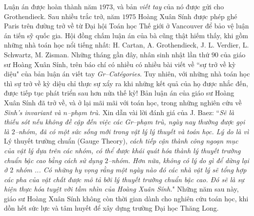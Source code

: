 \begin{multicols}{2}
	\vskip 0.1cm
	Luận án được hoàn thành năm $1973$, và bản \textit{viết tay} của nó được gửi cho Grothendieck. Sau nhiều trắc trở, năm $1975$ Hoàng Xuân Sính được phép ghé Paris trên đường trở về từ Đại hội Toán học Thế giới ở Vancouver để bảo vệ luận án tiến sỹ quốc gia. Hội đồng chấm luận án của bà cũng thật hiếm thấy, khi gồm những nhà toán học nổi tiếng nhất: H. Cartan, A. Grothendieck,  J. L. Verdier, L. Schwartz, M. Zisman.
	\vskip 0.1cm
	Những tháng gần đây, nhân sinh nhật lần thứ $90$ của giáo sư Hoàng Xuân Sính,   trên báo chí có nhiều có nhiều bài viết về ``sự trở về kỳ diệu" của bản luận án viết tay \textit{Gr--Catégories}. Tuy nhiên, với những nhà toán học thì sự trở về kỳ diệu chỉ thực sự xẩy ra khi những kết quả của họ được nhắc đến, được tiếp tục phát triển sau hơn nửa thế kỷ! Bản luận án của giáo sư Hoàng Xuân Sính đã trở về, và ở lại mãi mãi với toán học, trong những nghiên cứu về \textit{Sinh's invariant và $n$--phạm trù.}
	\vskip 0.1cm
	Xin dẫn vài lời đánh giá của  J. Baez:
	\vskip 0.1cm
	``\textit{Sẽ là thiếu sót nếu không đề cập đến việc các Gr--phạm trù,  ngày nay thường được gọi là $2$--nhóm,  đã có một sức sống mới trong vật lý lý thuyết và toán học.
	\vskip 0.1cm
	Lý do là vì} Lý thuyết trường chuẩn (Gauge Theory), \textit{cách tiếp cận thành công ngoạn mục của vật lý dựa trên các nhóm, có thể được khái quát hóa thành lý thuyết trường chuẩn bậc cao bằng cách sử dụng $2$--nhóm.
	\vskip 0.1cm
	Hơn nữa, không có lý do gì để dừng lại ở $2$ nhóm ... Có những hy vọng rằng một ngày nào đó các nhà vật lý sẽ tổng hợp các pha của vật chất được mô tả bởi lý thuyết trường chuẩn bậc cao. Đó sẽ là sự hiện thực hóa tuyệt vời tầm nhìn của Hoàng Xuân Sính.}"
	\vskip 0.1cm
	Những năm sau này, giáo sư Hoàng Xuân Sính không còn thời gian dành cho nghiên cứu toán học, khi dồn hết sức lực và tâm huyết để xây dựng trường Đại học Thăng Long. 
	\begin{figure}[H]
		\vspace*{-5pt}
		\centering
		\captionsetup{labelformat= empty, justification=centering}

\end{figure}
\end{multicols}

